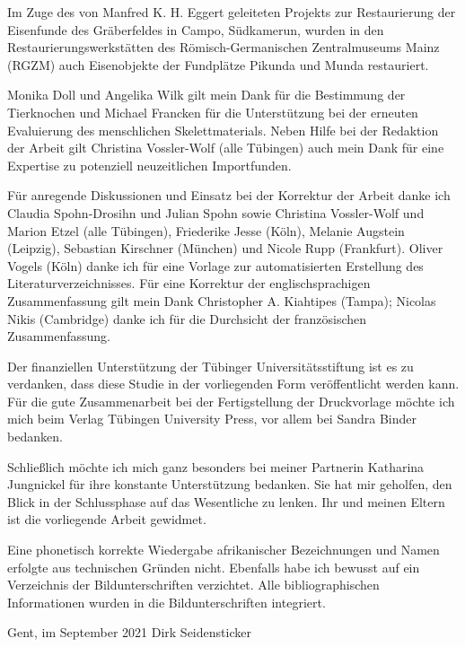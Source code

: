 \begin{multicols}{2}
Im Zuge des von Manfred K. H. Eggert geleiteten Projekts zur Restaurierung der Eisenfunde des Gräberfeldes in Campo, Südkamerun, wurden in den Restaurierungswerkstätten des Römisch-Germanischen Zentralmuseums Mainz (RGZM) auch Eisenobjekte der Fundplätze Pikunda und Munda restauriert.

Monika Doll und Angelika Wilk gilt mein Dank für die Bestimmung der Tierknochen und Michael Francken für die Unterstützung bei der erneuten Evaluierung des menschlichen Skelettmaterials. Neben Hilfe bei der Redaktion der Arbeit gilt Christina Vossler-Wolf (alle Tübingen) auch mein Dank für eine Expertise zu potenziell neuzeitlichen Importfunden.

Für anregende Diskussionen und Einsatz bei der Korrektur der Arbeit danke ich Claudia Spohn-Drosihn und Julian Spohn sowie Christina Vossler-Wolf und Marion Etzel (alle Tübingen), Friederike Jesse (Köln), Melanie Augstein (Leipzig), Sebastian Kirschner (München) und Nicole Rupp (Frankfurt). Oliver Vogels (Köln) danke ich für eine Vorlage zur automatisierten Erstellung des Literaturverzeichnisses. Für eine Korrektur der englischsprachigen Zusammenfassung gilt mein Dank Christopher A. \mbox{Kiahtipes} (Tampa); Nicolas Nikis (Cambridge) danke ich für die Durchsicht der französischen Zusammenfassung.

Der finanziellen Unterstützung der Tübinger Universitätsstiftung ist es zu verdanken, dass diese Studie in der vorliegenden Form veröffentlicht werden kann. Für die gute Zusammenarbeit bei der Fertigstellung der Druckvorlage möchte ich mich beim Verlag Tübingen University Press, vor allem bei Sandra Binder bedanken.

Schließlich möchte ich mich ganz besonders bei meiner Partnerin Katharina Jungnickel für ihre konstante Unterstützung bedanken. Sie hat mir geholfen, den Blick in der Schlussphase auf das Wesentliche zu lenken. Ihr und meinen Eltern ist die vorliegende Arbeit gewidmet.

Eine phonetisch korrekte Wiedergabe afrikanischer Bezeichnungen und Namen erfolgte aus technischen Gründen nicht. Ebenfalls habe ich bewusst auf ein Verzeichnis der Bildunterschriften verzichtet. Alle bibliographischen Informationen wurden in die Bildunterschriften integriert.

\vspace{1em}
\noindent Gent, im September 2021 \hfill Dirk Seidensticker
\end{multicols}
\pagestyle{fancy}